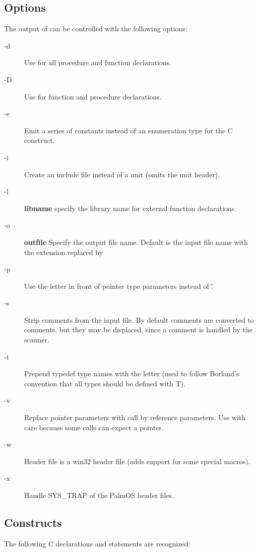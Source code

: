 \subsection{Options}
The output of   can be controlled with the following options:

\begin{description}
\item[-d] Use  for all procedure and function declarations.
\item[-D] Use  for function and
procedure declarations.
\item[-e] Emit a series of constants instead of an enumeration type for the
C  construct.
\item[-i] Create an include file instead of a unit (omits the unit header).
\item[-l] \textbf{libname} specify the library name for external function
declarations.
\item[-o] \textbf{outfile} Specify the output file name. Default is the input file name with
the extension replaced by 
\item[-p] Use the letter  in front of pointer type parameters instead of \^.
\item[-s] Strip comments from the input file. By default comments are converted
to comments, but they may be displaced, since a comment is handled by the
scanner.
\item[-t] Prepend typedef type names with the letter  (used to follow
Borland's convention that all types should be defined with T).
\item[-v] Replace pointer parameters with call by reference parameters.
Use with care because some calls can expect a  pointer.
\item[-w] Header file is a win32 header file (adds support for some special macros).
\item[-x] Handle SYS\_TRAP of the PalmOS header files.
\end{description}

\subsection{Constructs}
The following C declarations and statements are recognized:

